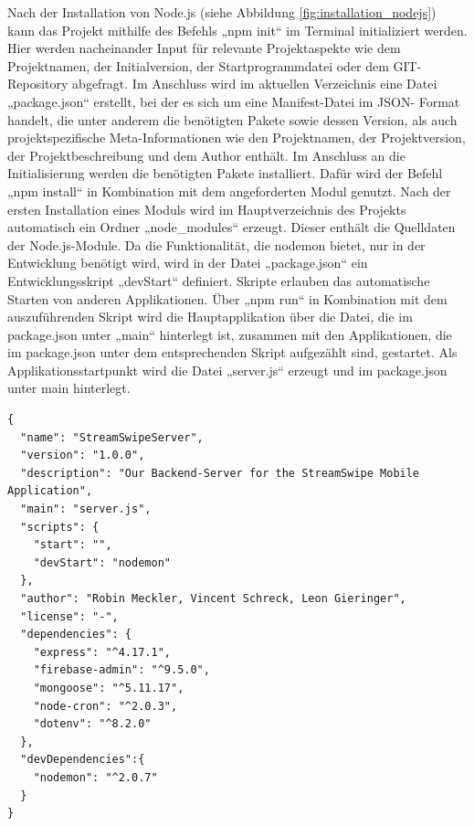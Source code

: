 \noindent
Nach der Installation von Node.js (siehe Abbildung \ref{fig:installation_nodejs}) kann das Projekt mithilfe des Befehls „npm init“ im Terminal initializiert werden. 
Hier werden nacheinander Input für relevante Projektaspekte wie dem Projektnamen, der Initialversion, der Startprogrammdatei oder dem GIT-Repository abgefragt.  
Im Anschluss wird im aktuellen Verzeichnis eine Datei „package.json“ erstellt,  bei der es sich um eine Manifest-Datei im JSON- Format handelt, die unter anderem die benötigten Pakete sowie dessen Version, als auch projektspezifische Meta-Informationen wie den Projektnamen, der Projektversion, der Projektbeschreibung und dem Author enthält.
\newline
Im Anschluss an die Initialisierung werden die benötigten Pakete installiert. Dafür wird der Befehl „npm install“ in Kombination mit dem angeforderten Modul genutzt. 
Nach der ersten Installation eines Moduls wird im Hauptverzeichnis des Projekts automatisch ein Ordner „node\_modules“ erzeugt. Dieser enthält die Quelldaten der Node.js-Module. 
\newline
Da die Funktionalität, die nodemon bietet, nur in der Entwicklung benötigt wird, wird in der Datei „package.json“ ein Entwicklungsskript „devStart“ definiert. 
Skripte erlauben das automatische Starten von anderen Applikationen. Über „npm run“ in Kombination mit dem auszuführenden Skript wird die Hauptapplikation über die Datei, die im package.json unter „main“ hinterlegt ist, zusammen mit den Applikationen, die im package.json unter dem entsprechenden Skript aufgezählt sind, gestartet.
\newline
Als Applikationsstartpunkt wird die Datei „server.js“ erzeugt und im package.json unter main hinterlegt. 

\begin{lstlisting}[caption=Datei package.json, label=lst:packagejson]
{
  "name": "StreamSwipeServer",
  "version": "1.0.0",
  "description": "Our Backend-Server for the StreamSwipe Mobile Application",
  "main": "server.js",
  "scripts": {
    "start": "",
    "devStart": "nodemon"
  },
  "author": "Robin Meckler, Vincent Schreck, Leon Gieringer",
  "license": "-",
  "dependencies": {
    "express": "^4.17.1",
    "firebase-admin": "^9.5.0",
    "mongoose": "^5.11.17",
    "node-cron": "^2.0.3",
    "dotenv": "^8.2.0"
  },
  "devDependencies":{
    "nodemon": "^2.0.7"
  }
}
\end{lstlisting}

